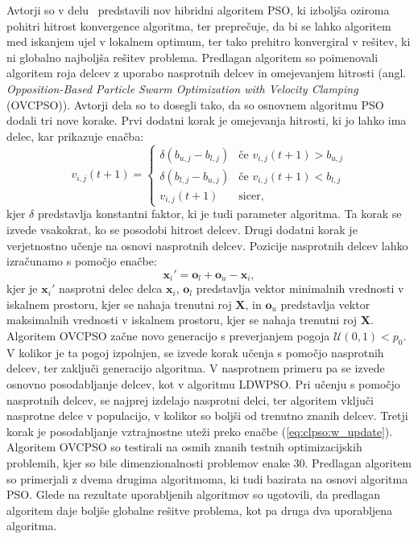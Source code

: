 Avtorji so v delu~\cite{alg:ovcpso} predstavili nov hibridni algoritem PSO, ki izboljša oziroma pohitri hitrost konvergence algoritma, ter preprečuje, da bi se lahko algoritem med iskanjem ujel v lokalnem optimum, ter tako prehitro konvergiral v rešitev, ki ni globalno najboljša rešitev problema.
Predlagan algoritem so poimenovali algoritem roja delcev z uporabo nasprotnih delcev in omejevanjem hitrosti (angl. \textit{Opposition-Based Particle Swarm Optimization with Velocity Clamping} (OVCPSO)).
Avtorji dela so to dosegli tako, da so osnovnem algoritmu PSO dodali tri nove korake.
Prvi dodatni korak je omejevanja hitrosti, ki jo lahko ima delec, kar prikazuje enačba:
\begin{equation}
    v_{i,j}(t + 1) = \begin{cases}
        \delta (b_{u, j} - b_{l, j}) &\text{če } v_{i,j}(t + 1) > b_{u, j}\\
        \delta (b_{l, j} - b_{u, j}) &\text{če } v_{i,j}(t + 1) < b_{l, j}\\
        v_{i,j}(t + 1) &\text{sicer},
    \end{cases}
\end{equation}
kjer $\delta$ predstavlja konstantni faktor, ki je tudi parameter algoritma.
Ta korak se izvede vsakokrat, ko se posodobi hitrost delcev.
Drugi dodatni korak je verjetnostno učenje na osnovi nasprotnih delcev.
Pozicije nasprotnih delcev lahko izračunamo s pomočjo enačbe:
\begin{equation}
    \mathbf{x}_i' = \mathbf{o}_l + \mathbf{o}_u - \mathbf{x}_i, \label{eq:ovcpso:opposite_particle}
\end{equation} 
kjer je $\mathbf{x}_i'$ nasprotni delec delca $\mathbf{x}_i$, $\mathbf{o}_l$ predstavlja vektor minimalnih vrednosti v iskalnem prostoru, kjer se nahaja trenutni roj $\mathbf{X}$, in $\mathbf{o}_u$ predstavlja vektor maksimalnih vrednosti v iskalnem prostoru, kjer se nahaja trenutni roj $\mathbf{X}$.
Algoritem OVCPSO začne novo generacijo s preverjanjem pogoja $\mathcal{U}(0, 1) < p_0$.
V kolikor je ta pogoj izpolnjen, se izvede korak učenja s pomočjo nasprotnih delcev, ter zaključi generacijo algoritma.
V nasprotnem primeru pa se izvede osnovno posodabljanje delcev, kot v algoritmu LDWPSO.
Pri učenju s pomočjo nasprotnih delcev, se najprej izdelajo nasprotni delci, ter algoritem vključi nasprotne delce v populacijo, v kolikor so boljši od trenutno znanih delcev.
Tretji korak je posodabljanje vztrajnostne uteži preko enačbe (\ref{eq:clpso:w_update}).
Algoritem OVCPSO so testirali na osmih znanih testnih optimizacijskih problemih, kjer so bile dimenzionalnosti problemov enake $30$.
Predlagan algoritem so primerjali z dvema drugima algoritmoma, ki tudi bazirata na osnovi algoritma PSO.
Glede na rezultate uporabljenih algoritmov so ugotovili, da predlagan algoritem daje boljše globalne rešitve problema, kot pa druga dva uporabljena algoritma.

